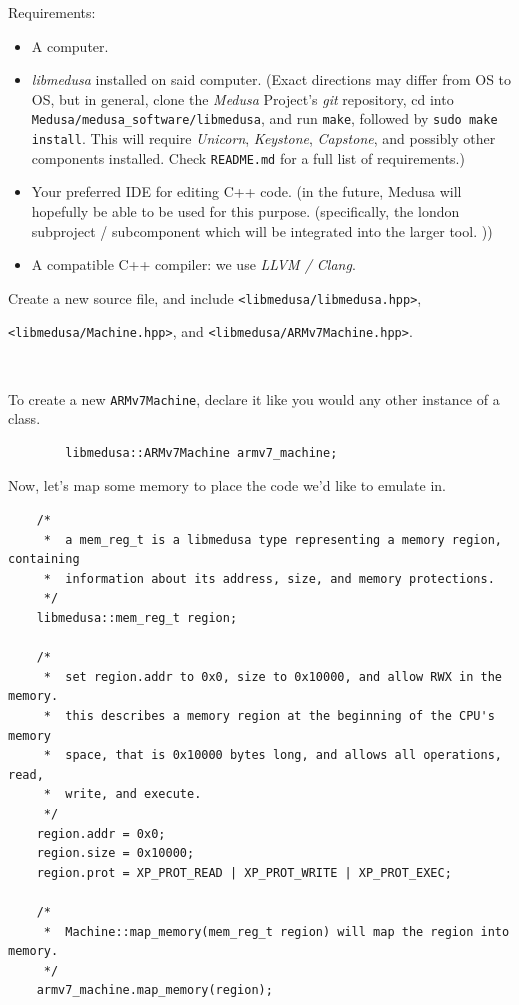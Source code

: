\documentclass{article}
\newcommand{\Medusa}{\textit{Medusa}\xspace}
\begin{document}
	Requirements:
	\begin{itemize}
		\item A computer.

		\item \textit{libmedusa} installed on said computer. (Exact directions
		may differ from OS to OS, but in general, clone the \Medusa Project's
		\textit{git} repository, cd into
		\texttt{Medusa/medusa\_software/libmedusa}, and run \texttt{make},
		followed by \texttt{sudo make install}. This will require
		\textit{Unicorn}, \textit{Keystone}, \textit{Capstone}, and possibly
		other components installed. Check \texttt{README.md} for a full list of
		requirements.)

		\item Your preferred IDE for editing C++ code. (in the future, Medusa
		will hopefully be able to be used for this purpose. (specifically, the
		london subproject / subcomponent which will be integrated into the
		larger tool. ))

		\item A compatible C++ compiler: we use \textit{LLVM / Clang}.
	\end{itemize}

	Create a new source file, and include \texttt{<libmedusa/libmedusa.hpp>}, \

	\texttt{<libmedusa/Machine.hpp>}, and \texttt{<libmedusa/ARMv7Machine.hpp>}.
	\
	
	\

	To create a new \texttt{ARMv7Machine}, declare it like you would any other
	instance of a class.

	\begin{verbatim}
		libmedusa::ARMv7Machine armv7_machine;
	\end{verbatim}

	Now, let's map some memory to place the code we'd like to emulate in.

	\begin{verbatim}
	/*
	 *  a mem_reg_t is a libmedusa type representing a memory region, containing
	 *  information about its address, size, and memory protections.
	 */
	libmedusa::mem_reg_t region;

	/*
	 *  set region.addr to 0x0, size to 0x10000, and allow RWX in the memory.
	 *  this describes a memory region at the beginning of the CPU's memory
	 *  space, that is 0x10000 bytes long, and allows all operations, read,
	 *  write, and execute.
	 */
	region.addr = 0x0;
	region.size = 0x10000;
	region.prot = XP_PROT_READ | XP_PROT_WRITE | XP_PROT_EXEC;

	/*
	 *  Machine::map_memory(mem_reg_t region) will map the region into memory.
	 */
	armv7_machine.map_memory(region);
	\end{verbatim}
\end{document}
